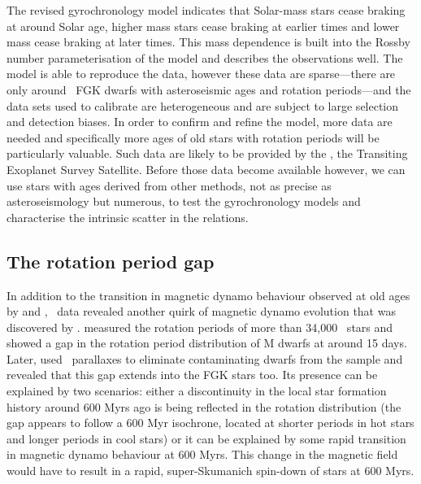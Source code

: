 The revised \citet{Vansaders2016} gyrochronology model indicates that
Solar-mass stars cease braking at around Solar age, higher mass stars cease
braking at earlier times and lower mass cease braking at later times.
This mass dependence is built into the Rossby number parameterisation of the
\citet{Vansaders2016} model and describes the observations well.
The \citet{Vansaders2016} model is able to reproduce the data, however these
data are sparse---there are only around \nastero\ FGK dwarfs with
asteroseismic ages and rotation periods---and the data sets used to calibrate
are heterogeneous and are subject to large selection and detection biases.
In order to confirm and refine the \citet{Vansaders2016} model, more data are
needed and specifically more ages of old stars with rotation periods will be
particularly valuable.
Such data are likely to be provided by the \tess, the Transiting Exoplanet
Survey Satellite.
Before those data become available however, we can use stars with ages derived
from other methods, not as precise as asteroseismology but numerous, to test
the gyrochronology models and characterise the intrinsic scatter in the
relations.

\subsection{The rotation period gap}
In addition to the transition in magnetic dynamo behaviour observed at old
ages by \citet{angus2015} and \citet{vansaders2016}, \kepler\ data revealed
another quirk of magnetic dynamo evolution that was discovered by
\citet{mcquillan2014}.
\citet{mcquillan2014} measured the rotation periods of more than 34,000
\kepler\ stars and showed a gap in the rotation period distribution of M
dwarfs at around 15 days.
Later, \citet{davenport2017} used \Gaia\ parallaxes to eliminate contaminating
dwarfs from the \citet{mcquillan2014} sample and revealed that this gap
extends into the FGK stars too.
Its presence can be explained by two scenarios: either a discontinuity in the
local star formation history around 600 Myrs ago is being reflected in the
rotation distribution (the gap appears to follow a 600 Myr isochrone, located
at shorter periods in hot stars and longer periods in cool stars) or it can be
explained by some rapid transition in magnetic dynamo behaviour at 600 Myrs.
This change in the magnetic field would have to result in a rapid,
super-Skumanich spin-down of stars at 600 Myrs.

